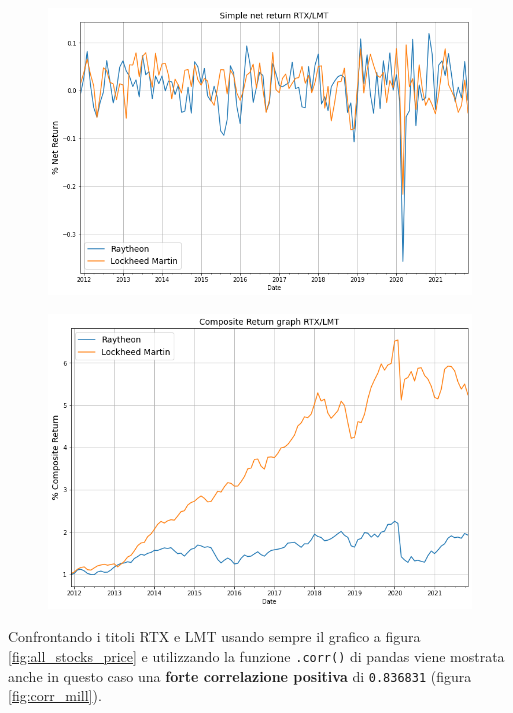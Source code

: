 \documentclass{article}
\begin{document}
\begin{figure}[h]
  \centering
  \begin{minipage}{.5\textwidth}
    \centering
    \includegraphics[width=1\linewidth]{mil_rendimenti_semplici_netti.png}
    \label{fig:rendimenti_semplici_mil}
  \end{minipage}%
  \begin{minipage}{.5\textwidth}
    \centering
    \includegraphics[width=.97\linewidth]{mil_rendimenti_composti.png}
    \label{fig:rendimenti_compositi_mil}
  \end{minipage}
\end{figure}

Confrontando i titoli RTX e LMT usando sempre il grafico a figura \ref{fig:all_stocks_price} e utilizzando la funzione \verb|.corr()| di pandas
viene mostrata anche in questo caso una \textbf{forte correlazione positiva} di \verb|0.836831| (figura \ref{fig:corr_mill}).
\end{document}
